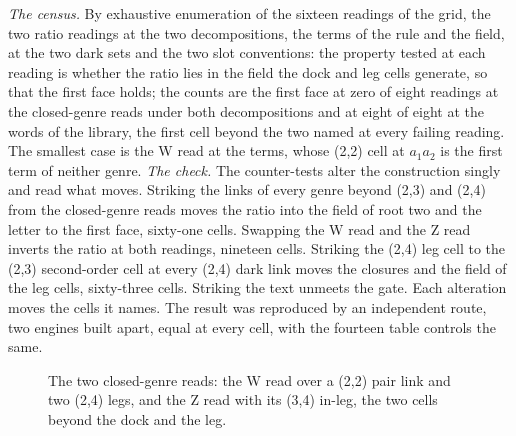 \begin{chproof}
\textit{The census.} By exhaustive enumeration of the sixteen readings of the grid, the two ratio readings at the two decompositions, the terms of the rule and the field, at the two dark sets and the two slot conventions: the property tested at each reading is whether the ratio lies in the field the dock and leg cells generate, so that the first face holds; the counts are the first face at zero of eight readings at the closed-genre reads under both decompositions and at eight of eight at the words of the library, the first cell beyond the two named at every failing reading. The smallest case is the W read at the terms, whose (2,2) cell at $a_{1}a_{2}$ is the first term of neither genre.
\textit{The check.} The counter-tests alter the construction singly and read what moves. Striking the links of every genre beyond (2,3) and (2,4) from the closed-genre reads moves the ratio into the field of root two and the letter to the first face, sixty-one cells. Swapping the W read and the Z read inverts the ratio at both readings, nineteen cells. Striking the (2,4) leg cell to the (2,3) second-order cell at every (2,4) dark link moves the closures and the field of the leg cells, sixty-three cells. Striking the text unmeets the gate. Each alteration moves the cells it names. The result was reproduced by an independent route, two engines built apart, equal at every cell, with the fourteen table controls the same.
\begin{figure}[h]\centering{}\caption{The two closed-genre reads: the W read over a (2,2) pair link and two (2,4) legs, and the Z read with its (3,4) in-leg, the two cells beyond the dock and the leg.}\end{figure}
\end{chproof}
\par\medskip{}\label{narr:close:6-2}\par

